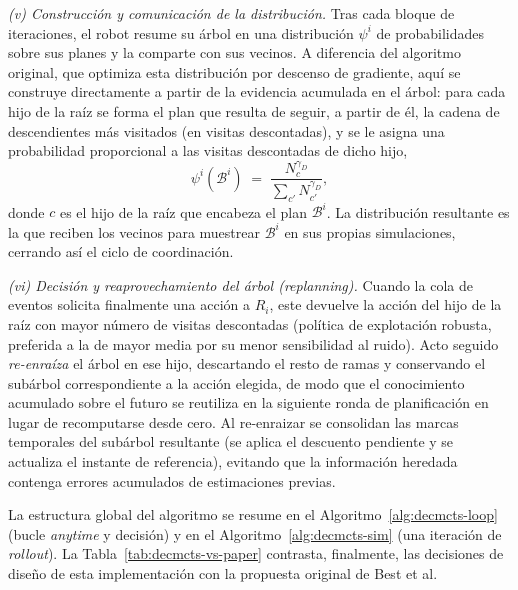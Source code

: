 \smallskip
\emph{(v) Construcción y comunicación de la distribución.}
Tras cada bloque de iteraciones, el robot resume su árbol en una distribución $\psi^{i}$ de probabilidades sobre sus planes y la comparte con sus vecinos. A diferencia del algoritmo original, que optimiza esta distribución por descenso de gradiente, aquí se construye directamente a partir de la evidencia acumulada en el árbol: para cada hijo de la raíz se forma el plan que resulta de seguir, a partir de él, la cadena de descendientes más visitados (en visitas descontadas), y se le asigna una probabilidad proporcional a las visitas descontadas de dicho hijo,
\begin{equation} \label{eq:dist-decmcts}
    \psi^{i}(\mathcal{B}^{i}) \;=\; \frac{N_{c}^{\gamma_D}}{\sum_{c'} N_{c'}^{\gamma_D}},
\end{equation}
donde $c$ es el hijo de la raíz que encabeza el plan $\mathcal{B}^{i}$. La distribución resultante es la que reciben los vecinos para muestrear $\mathcal{B}^{i}$ en sus propias simulaciones, cerrando así el ciclo de coordinación.

\smallskip
\emph{(vi) Decisión y reaprovechamiento del árbol (replanning).}
Cuando la cola de eventos solicita finalmente una acción a $R_i$, este devuelve la acción del hijo de la raíz con mayor número de visitas descontadas (política de explotación robusta, preferida a la de mayor media por su menor sensibilidad al ruido). Acto seguido \emph{re-enraíza} el árbol en ese hijo, descartando el resto de ramas y conservando el subárbol correspondiente a la acción elegida, de modo que el conocimiento acumulado sobre el futuro se reutiliza en la siguiente ronda de planificación en lugar de recomputarse desde cero. Al re-enraizar se consolidan las marcas temporales del subárbol resultante (se aplica el descuento pendiente y se actualiza el instante de referencia), evitando que la información heredada contenga errores acumulados de estimaciones previas.

\smallskip
La estructura global del algoritmo se resume en el Algoritmo~\ref{alg:decmcts-loop} (bucle \emph{anytime} y decisión) y en el Algoritmo~\ref{alg:decmcts-sim} (una iteración de \textit{rollout}). La Tabla~\ref{tab:decmcts-vs-paper} contrasta, finalmente, las decisiones de diseño de esta implementación con la propuesta original de Best et al.

